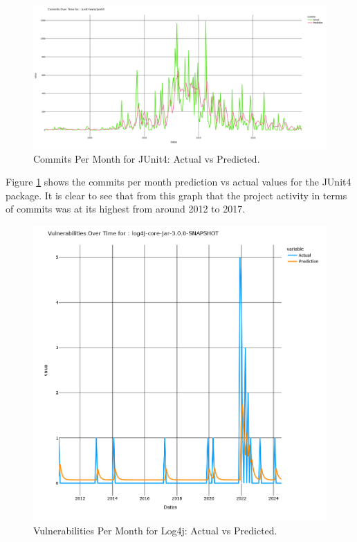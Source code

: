 \documentclass[conference]{IEEEtran}
\begin{document}
\begin{figure}[H]
    \centering
    \includegraphics[width=1\linewidth]{JUnit4commits.png}
    \caption{Commits Per Month for JUnit4: Actual vs Predicted.} 
    \label{fig:commits}
\end{figure}

Figure \ref{fig:commits} shows the commits per month prediction vs actual values for the JUnit4 package. It is clear to see that from this graph that the project activity in terms of commits was at its highest from around 2012 to 2017. 

\begin{figure}[H]
    \centering
    \includegraphics[width=1\linewidth]{Log4jVuls.png}
    \caption{Vulnerabilities Per Month for Log4j: Actual vs Predicted.} 
    \label{fig:vulns}
\end{figure}
\end{document}
